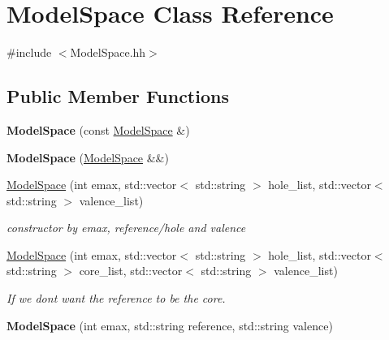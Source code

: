 \hypertarget{classModelSpace}{}\section{Model\+Space Class Reference}
\label{classModelSpace}


{\ttfamily \#include $<$Model\+Space.\+hh$>$}

\subsection*{Public Member Functions}
\begin{DoxyCompactItemize}
\item 
\mbox{\label{classModelSpace_a9554b9bc74b82e392fafc9de496fce5f}} 
{\bfseries Model\+Space} (const \hyperlink{classModelSpace}{Model\+Space} \&)
\item 
\mbox{\label{classModelSpace_a6fe287e59b9aca7719a553f7dedcd2d7}} 
{\bfseries Model\+Space} (\hyperlink{classModelSpace}{Model\+Space} \&\&)
\item 
\hyperlink{classModelSpace_a48d732fa9364d473f55d1ad0c1b5da60}{Model\+Space} (int emax, std\+::vector$<$ std\+::string $>$ hole\+\_\+list, std\+::vector$<$ std\+::string $>$ valence\+\_\+list)
\begin{DoxyCompactList}\small\item\em constructor by emax, reference/hole and valence \end{DoxyCompactList}\item 
\mbox{\label{classModelSpace_a8a66fe8539ab34bc1addf2703fbf627e}} 
\hyperlink{classModelSpace_a8a66fe8539ab34bc1addf2703fbf627e}{Model\+Space} (int emax, std\+::vector$<$ std\+::string $>$ hole\+\_\+list, std\+::vector$<$ std\+::string $>$ core\+\_\+list, std\+::vector$<$ std\+::string $>$ valence\+\_\+list)
\begin{DoxyCompactList}\small\item\em If we don\textquotesingle{}t want the reference to be the core. \end{DoxyCompactList}\item 
\mbox{\label{classModelSpace_ab095c4be09ac5d7c109b0bf103fe529a}} 
{\bfseries Model\+Space} (int emax, std\+::string reference, std\+::string valence)
\item 

\end{DoxyCompactItemize}
